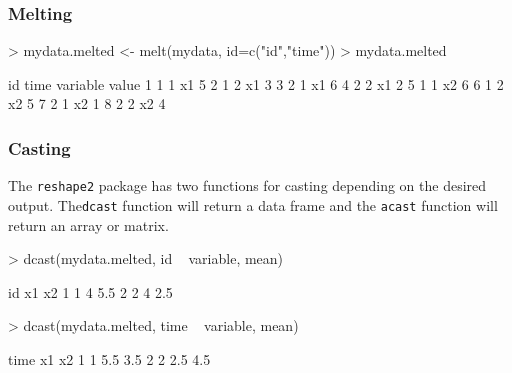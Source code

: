 \documentclass[10pt,slidestop,mathserif,c]{beamer}
\begin{document}
\begin{frame}
	\frametitle{Melting}
	
\begin{Schunk}
\begin{Sinput}
> mydata.melted <- melt(mydata, id=c("id","time"))
> mydata.melted
\end{Sinput}
\begin{Soutput}
  id time variable value
1  1    1       x1     5
2  1    2       x1     3
3  2    1       x1     6
4  2    2       x1     2
5  1    1       x2     6
6  1    2       x2     5
7  2    1       x2     1
8  2    2       x2     4
\end{Soutput}
\end{Schunk}

\end{frame}

\begin{frame}
	\frametitle{Casting}
	The \texttt{reshape2} package has two functions for casting depending on the desired output. The\texttt{dcast} function will return a data frame and the \texttt{acast} function will return an array or matrix.

\begin{Schunk}
\begin{Sinput}
> dcast(mydata.melted, id ~ variable, mean)
\end{Sinput}
\begin{Soutput}
  id x1  x2
1  1  4 5.5
2  2  4 2.5
\end{Soutput}
\begin{Sinput}
> dcast(mydata.melted, time ~ variable, mean)
\end{Sinput}
\begin{Soutput}
  time  x1  x2
1    1 5.5 3.5
2    2 2.5 4.5
\end{Soutput}
\end{Schunk}

\end{frame}


\end{document}
